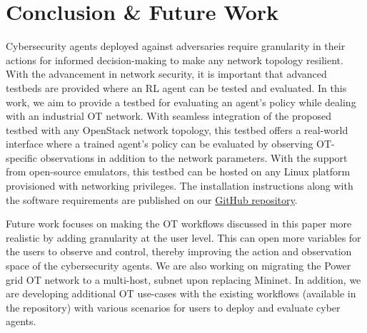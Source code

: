 \section{Conclusion \& Future Work}
\label{sec:conclusion}

Cybersecurity agents deployed against adversaries require granularity in their actions for informed decision-making to make any network topology resilient. With the advancement in network security, it is important that advanced testbeds are provided where an RL agent can be tested and evaluated. In this work, we aim to provide a testbed for evaluating an agent's policy while dealing with an industrial OT network. With seamless integration of the proposed testbed with any OpenStack network topology, this testbed offers a real-world interface where a trained agent's policy can be evaluated by observing OT-specific observations in addition to the network parameters. With the support from open-source emulators, this testbed can be hosted on any Linux platform provisioned with networking privileges. The installation instructions along with the software requirements are published on our \href{https://github.com/CASTLEGym/OT-Networks.git}{GitHub repository}.

Future work focuses on making the OT workflows discussed in this paper more realistic by adding granularity at the user level. This can open more variables for the users to observe and control, thereby improving the action and observation space of the cybersecurity agents. We are also working on migrating the Power grid OT network to a multi-host, subnet upon replacing Mininet. In addition, we are developing additional OT use-cases with the existing workflows (available in the repository) with various scenarios for users to deploy and evaluate cyber agents.